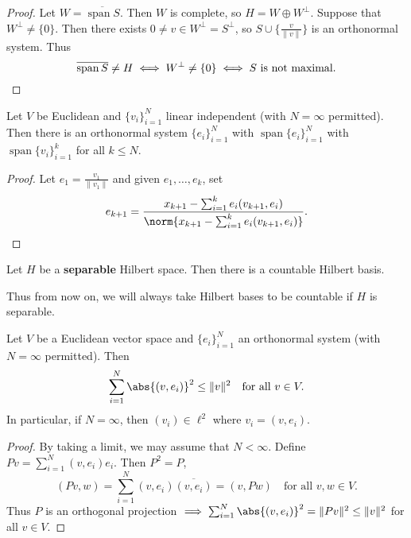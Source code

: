 \documentclass{article}
\DeclareMathOperator{\spn}{span}
\begin{document}
\begin{proof}
    Let $W = \overline{\spn S}$. Then $W$ is complete, so $H = W \oplus W^\bot$. Suppose that $W^\bot \neq \{0\}$.
    Then there exists $0 \neq v \in W^\bot = S^\bot$, so $S \cup \{\frac{v}{\|v\|}\}$ is an orthonormal system. Thus
    \begin{equation*}
        \overline{\spn S} \neq H \iff W^\bot \neq \{0\} \iff S \text{ is not maximal.} \qedhere
    \end{equation*}
\end{proof}

\begin{fact}
    Let $V$ be Euclidean and $\{v_i\}_{i=1}^N$ linear independent (with $N = \infty$ permitted).
    Then there is an orthonormal system $\{e_i\}_{i=1}^N$ with $\spn \{e_i\}_{i=1}^N$ with $\spn \{v_i\}_{i=1}^k$ for all $k \leq N$.
\end{fact}

\begin{proof}
    Let $e_1 = \frac{v_1}{\|v_1\|}$ and given $e_1, \dotsc, e_k$, set
    \begin{equation*}
        e_{k+1} = \frac{x_{k+1} - \sum_{i=1}^k e_i (v_{k+1}, e_i)}{\norm{x_{k+1} - \sum_{i=1}^k e_i (v_{k+1}, e_i)}}.\qedhere
    \end{equation*}
\end{proof}

\begin{cor}
    Let $H$ be a \textbf{separable} Hilbert space. Then there is a countable Hilbert basis.
\end{cor}
Thus from now on, we will always take Hilbert bases to be countable if $H$ is separable.

\begin{prop}
    Let $V$ be a Euclidean vector space and $\{e_i\}_{i=1}^N$ an orthonormal system (with $N=\infty$ permitted). Then
    \begin{equation*}
        \sum_{i=1}^N \abs{(v, e_i)}^2 \leq \|v\|^2 \quad \text{for all } v \in V.
    \end{equation*}
    In particular, if $N = \infty$, then $(v_i) \in \ell^2$ where $v_i = (v, e_i)$.
\end{prop}

\begin{proof}
    By taking a limit, we may assume that $N < \infty$. Define $Pv = \sum_{i=1}^N (v, e_i) e_i$. Then $P^2 = P$,
    \begin{equation*}
        (Pv, w) = \sum_{i=1}^N (v, e_i) \overline{(v, e_i)} = (v, Pw) \quad \text{for all } v, w \in V.
    \end{equation*}
    Thus $P$ is an orthogonal projection $\implies \sum_{i=1}^N \abs{(v, e_i)}^2 = \|Pv\|^2 \leq \|v\|^2$ for all $v \in V$.
\end{proof}
\end{document}
